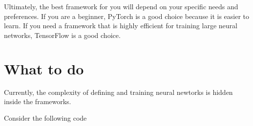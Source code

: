 \documentclass[10pt,a4paper]{article}
\begin{document}
Ultimately, the best framework for you will depend on your specific needs and preferences. If you are a beginner, PyTorch is a good choice because it is easier to learn. If you need a framework that is highly efficient for training large neural networks, TensorFlow is a good choice.

\section{What to do}

Currently, the complexity of defining and training neural newtorks is hidden inside the frameworks.

Consider the following code
\end{document}
